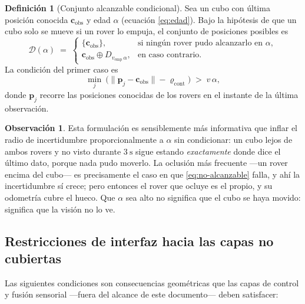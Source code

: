 \documentclass[11pt,a4paper]{article}
\theoremstyle{definition}
\newtheorem{definicion}[teorema]{Definición}
\newtheorem{observacion}[teorema]{Observación}
\newcommand{\cc}{\mathbf{c}}
\newcommand{\pp}{\mathbf{p}}
\begin{document}
\begin{definicion}[Conjunto alcanzable condicional]
Sea un cubo con última posición conocida $\cc_{\mathrm{obs}}$ y edad $\alpha$
(ecuación \eqref{eq:edad}). Bajo la hipótesis de que un cubo solo se mueve si un rover lo
empuja, el conjunto de posiciones posibles es
\begin{equation}
  \mathcal D(\alpha) \;=\;
  \begin{cases}
    \{\cc_{\mathrm{obs}}\}, & \text{si ningún rover pudo alcanzarlo en } \alpha, \\[6pt]
    \cc_{\mathrm{obs}} \oplus D_{v_{\mathrm{emp}}\,\alpha}, & \text{en caso contrario.}
  \end{cases}
  \label{eq:alcanzable}
\end{equation}
La condición del primer caso es
\begin{equation}
  \min_{j}\ \Big(\|\pp_j - \cc_{\mathrm{obs}}\| - \varrho_{\mathrm{cont}}\Big) \;>\; v\,\alpha ,
  \label{eq:no-alcanzable}
\end{equation}
donde $\pp_j$ recorre las posiciones conocidas de los rovers en el instante de la última
observación.
\end{definicion}

\begin{observacion}
Esta formulación es sensiblemente más informativa que inflar el radio de incertidumbre
proporcionalmente a $\alpha$ sin condicionar: un cubo lejos de ambos rovers y no visto
durante $3\ \mathrm{s}$ sigue estando \emph{exactamente} donde dice el último dato, porque
nada pudo moverlo. La oclusión más frecuente ---un rover encima del cubo--- es
precisamente el caso en que \eqref{eq:no-alcanzable} falla, y ahí la incertidumbre sí
crece; pero entonces el rover que ocluye es el propio, y su odometría cubre el hueco.
Que $\alpha$ sea alto no significa que el cubo se haya movido: significa que la visión no
lo ve.
\end{observacion}

\subsection{Restricciones de interfaz hacia las capas no cubiertas}

Las siguientes condiciones son consecuencias geométricas que las capas de control y
fusión sensorial ---fuera del alcance de este documento--- deben satisfacer:
\end{document}
